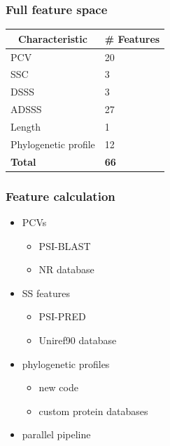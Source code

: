 \documentclass{beamer}
\begin{document}
\begin{frame}
  \frametitle{Full feature space}
  \begin{table} \centering
  \begin{tabular}{ l l }
    \hline
    \multicolumn{1}{c}{\textbf{Characteristic}} & \textbf{\# Features} \\ \hline
    PCV    & 20 \\
    SSC    & 3  \\
    DSSS   & 3  \\
    ADSSS  & 27 \\
    Length & 1  \\
    Phylogenetic profile \hspace{15px} & 12 \\
    \textbf{Total} & \textbf{66} \\ \hline
  \end{tabular}
  \vspace{5px}
\end{table}
\end{frame}
\begin{frame}
  \frametitle{Feature calculation}
  \begin{itemize}
    \item PCVs
      \begin{itemize}
        \item PSI-BLAST
        \item NR database
      \end{itemize}
    \item SS features
      \begin{itemize}
        \item PSI-PRED
        \item Uniref90 database
      \end{itemize}
    \item phylogenetic profiles
      \begin{itemize}
        \item new code
        \item custom protein databases
      \end{itemize}
    \item parallel pipeline
  \end{itemize}
\end{frame}
\end{document}
